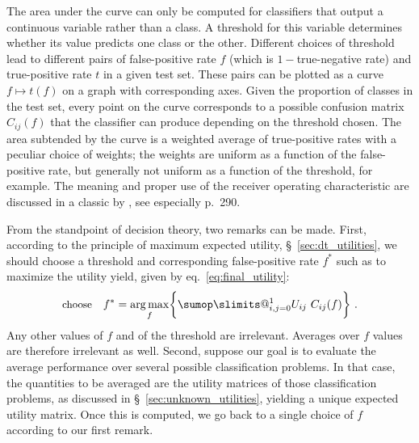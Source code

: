 \documentclass[\ifafour a4paper,12pt,\else a5paper,10pt,\fi%
onecolumn,oneside,article,%
british%
]{memoir}
\makeatletter
\theoremstyle{remark}
\theoremstyle{innote}
\def\sum{\DOTSI\sumop\slimits@}
\DeclarePairedDelimiter\set{\{}{\}} %
\renewcommand*{\|}[1][]{\nonscript\:#1\vert\nonscript\:\mathopen{}}
\newcommand*{\sect}{\S}%
\newcommand*{\eqn}{eq.}%
\DeclareMathOperator*{\argmax}{arg\,max}
\makeatother
\begin{document}
The area under the curve can only be computed for classifiers that output a continuous variable rather than a class. A threshold for this variable determines whether its value predicts one class or the other. Different choices of threshold lead to different pairs of false-positive rate $f$ (which is $1-{}$true-negative rate) and true-positive rate $t$ in a given test set. These pairs can be plotted as a curve $f \mapsto t(f)$ on a graph with corresponding axes. Given the proportion of classes in the test set, every point on the curve corresponds to a possible confusion matrix $C_{ij}(f)$ that the classifier can produce depending on the threshold chosen. The area subtended by the curve is a weighted average of true-positive rates with a peculiar choice of weights; the weights are uniform as a function of the false-positive rate, but generally not uniform as a function of the threshold, for example. The meaning and proper use of the receiver operating characteristic are discussed in a classic by \cites{metz1978}, see especially p.~290.


\medskip

From the standpoint of decision theory, two remarks can be made\autocites[similar points are made by][]{bakeretal2001,loboetal2008}. First, according to the principle of maximum expected utility, \sect~\ref{sec:dt_utilities}, we should choose a threshold and corresponding false-positive rate $f^{*}$ such as to maximize the utility yield, given by \eqn~\eqref{eq:final_utility}:
\begin{equation}
  \label{eq:threshold_auc_maxutility}
  \text{\small choose}\quad
  f^{*} = \argmax_{f}\set[\bigg]{\sum_{i,j=0}^{1} U_{ij}\ C_{ij}(f)} \ .
\end{equation}
Any other values of $f$ and of the threshold are irrelevant. Averages over $f$ values are therefore irrelevant as well. Second, suppose our goal is to evaluate the average performance over several possible classification problems. In that case, the quantities to be averaged are the utility matrices of those classification problems, as discussed in \sect~\ref{sec:unknown_utilities}, yielding a unique expected utility matrix. Once this is computed, we go back to a single choice of $f$ according to our first remark.
\end{document}
